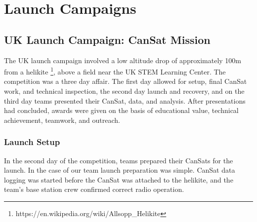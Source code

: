 \documentclass[]{report}
\begin{document}
	\chapter{Launch Campaigns}	
	\section{UK Launch Campaign: CanSat Mission}
	The UK launch campaign involved a low altitude drop of approximately 100m from a helikite \footnote{https://en.wikipedia.org/wiki/Allsopp\_Helikite}, above a field near the UK STEM Learning Center. The competition was a three day affair. The first day allowed for setup, final CanSat work, and technical inspection, the second day launch and recovery, and on the third day teams presented their CanSat, data, and analysis. After presentations had concluded, awards were given on the basis of educational value, technical achievement, teamwork, and outreach.
	\subsection{Launch Setup}
	In the second day of the competition, teams prepared their CanSats for the launch. In the case of our team launch preparation was simple. CanSat data logging was started before the CanSat was attached to the helikite, and the team's base station crew confirmed correct radio operation.
	
\end{document}
